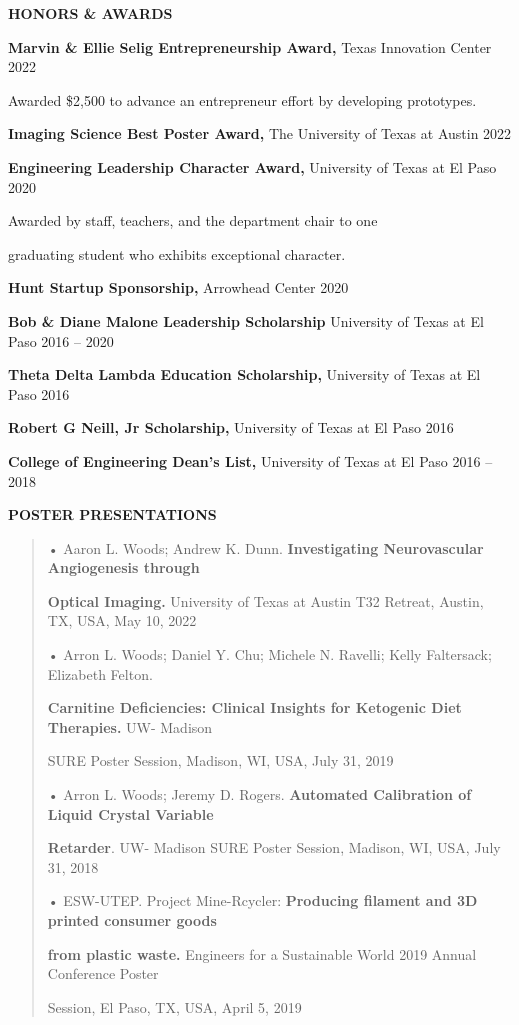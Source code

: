 \documentclass[
]{article}
\begin{document}
\textbf{HONORS \& AWARDS}

\textbf{Marvin \& Ellie Selig Entrepreneurship Award,} Texas Innovation
Center 2022

Awarded \$2,500 to advance an entrepreneur effort by developing
prototypes.

\textbf{Imaging Science Best Poster Award,} The University of Texas at
Austin 2022

\textbf{Engineering Leadership Character Award,} University of Texas at
El Paso 2020

Awarded by staff, teachers, and the department chair to one

graduating student who exhibits exceptional character.

\textbf{Hunt Startup Sponsorship,} Arrowhead Center 2020

\textbf{Bob \& Diane Malone Leadership Scholarship} University of Texas
at El Paso 2016 -- 2020

\textbf{Theta Delta Lambda Education Scholarship,} University of Texas
at El Paso 2016

\textbf{Robert G Neill, Jr Scholarship,} University of Texas at El Paso
2016

\textbf{College of Engineering Dean's List,} University of Texas at El
Paso 2016 -- 2018

\textbf{POSTER PRESENTATIONS}

\begin{quote}
• Aaron L. Woods; Andrew K. Dunn. \textbf{Investigating Neurovascular
Angiogenesis through}

\textbf{Optical Imaging.} University of Texas at Austin T32 Retreat,
Austin, TX, USA, May 10, 2022

• Arron L. Woods; Daniel Y. Chu; Michele N. Ravelli; Kelly Faltersack;
Elizabeth Felton.

\textbf{Carnitine Deficiencies: Clinical Insights for Ketogenic Diet
Therapies.} UW- Madison

SURE Poster Session, Madison, WI, USA, July 31, 2019

• Arron L. Woods; Jeremy D. Rogers. \textbf{Automated Calibration of
Liquid Crystal Variable}

\textbf{Retarder}. UW- Madison SURE Poster Session, Madison, WI, USA,
July 31, 2018

• ESW-UTEP. Project Mine-Rcycler: \textbf{Producing filament and 3D
printed consumer goods}

\textbf{from plastic waste.} Engineers for a Sustainable World 2019
Annual Conference Poster

Session, El Paso, TX, USA, April 5, 2019
\end{quote}
\end{document}
